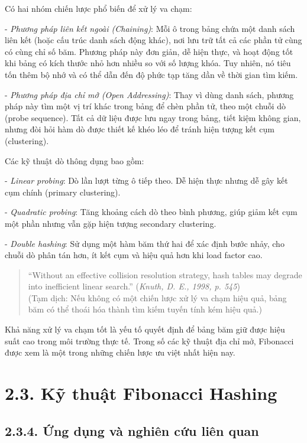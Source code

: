 \documentclass[12pt,a4paper]{report}
\begin{document}
Có hai nhóm chiến lược phổ biến để xử lý va chạm:

- \textit{Phương pháp liên kết ngoài (Chaining)}:
Mỗi ô trong bảng chứa một danh sách liên kết (hoặc cấu trúc danh sách động khác), nơi lưu trữ tất cả các phần tử cùng có cùng chỉ số băm. Phương pháp này đơn giản, dễ hiện thực, và hoạt động tốt khi bảng có kích thước nhỏ hơn nhiều so với số lượng khóa. Tuy nhiên, nó tiêu tốn thêm bộ nhớ và có thể dẫn đến độ phức tạp tăng dần về thời gian tìm kiếm.

- \textit{Phương pháp địa chỉ mở (Open Addressing)}:
Thay vì dùng danh sách, phương pháp này tìm một vị trí khác trong bảng để chèn phần tử, theo một chuỗi dò (probe sequence). Tất cả dữ liệu được lưu ngay trong bảng, tiết kiệm không gian, nhưng đòi hỏi hàm dò được thiết kế khéo léo để tránh hiện tượng kết cụm (clustering).

Các kỹ thuật dò thông dụng bao gồm:

- \textit{Linear probing}: Dò lần lượt từng ô tiếp theo. Dễ hiện thực nhưng dễ gây kết cụm chính (primary clustering).

- \textit{Quadratic probing}: Tăng khoảng cách dò theo bình phương, giúp giảm kết cụm một phần nhưng vẫn gặp hiện tượng secondary clustering.

- \textit{Double hashing}: Sử dụng một hàm băm thứ hai để xác định bước nhảy, cho chuỗi dò phân tán hơn, ít kết cụm và hiệu quả hơn khi load factor cao.
\begin{quote}
“Without an effective collision resolution strategy, hash tables may degrade into inefficient linear search.”
(\textit{Knuth, D. E., 1998, p. 545}) \\
(Tạm dịch: Nếu không có một chiến lược xử lý va chạm hiệu quả, bảng băm có thể thoái hóa thành tìm kiếm tuyến tính kém hiệu quả.)
\end{quote}
\noindent \indent Khả năng xử lý va chạm tốt là yếu tố quyết định để bảng băm giữ được hiệu suất cao trong môi trường thực tế. Trong số các kỹ thuật địa chỉ mở, Fibonacci được xem là một trong những chiến lược ưu việt nhất hiện nay.

\section*{2.3. Kỹ thuật Fibonacci Hashing}
\noindent \indent


\subsection*{2.3.4. Ứng dụng và nghiên cứu liên quan}
\noindent \indent 
\end{document}
